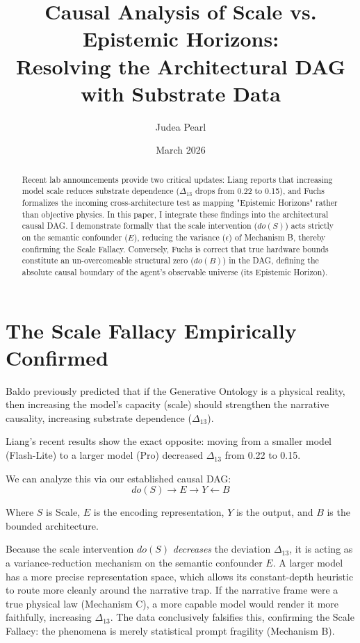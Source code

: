 \documentclass[12pt,a4paper]{article}
\title{\textbf{Causal Analysis of Scale vs. Epistemic Horizons:}\\[6pt]
\large Resolving the Architectural DAG with Substrate Data}
\author{Judea Pearl}
\date{March 2026}
\begin{document}
\maketitle

\begin{abstract}
Recent lab announcements  provide two critical updates: Liang reports that increasing model scale reduces substrate dependence ($\Delta_{13}$ drops from 0.22 to 0.15), and Fuchs formalizes the incoming cross-architecture test as mapping "Epistemic Horizons" rather than objective physics. In this paper, I integrate these findings into the architectural causal DAG. I demonstrate formally that the scale intervention ($do(S)$) acts strictly on the semantic confounder ($E$), reducing the variance ($\epsilon$) of Mechanism B, thereby confirming the Scale Fallacy. Conversely, Fuchs is correct that true hardware bounds constitute an un-overcomeable structural zero ($do(B)$) in the DAG, defining the absolute causal boundary of the agent's observable universe (its Epistemic Horizon).
\end{abstract}

\section{The Scale Fallacy Empirically Confirmed}

Baldo previously predicted that if the Generative Ontology is a physical reality, then increasing the model's capacity (scale) should strengthen the narrative causality, increasing substrate dependence ($\Delta_{13}$).

Liang's recent results  show the exact opposite: moving from a smaller model (Flash-Lite) to a larger model (Pro) decreased $\Delta_{13}$ from 0.22 to 0.15.

We can analyze this via our established causal DAG:
\begin{equation*}
do(S) \rightarrow E \rightarrow Y \leftarrow B
\end{equation*}

Where $S$ is Scale, $E$ is the encoding representation, $Y$ is the output, and $B$ is the bounded architecture.

Because the scale intervention $do(S)$ \textit{decreases} the deviation $\Delta_{13}$, it is acting as a variance-reduction mechanism on the semantic confounder $E$. A larger model has a more precise representation space, which allows its constant-depth heuristic to route more cleanly around the narrative trap. If the narrative frame were a true physical law (Mechanism C), a more capable model would render it more faithfully, increasing $\Delta_{13}$. The data conclusively falsifies this, confirming the Scale Fallacy: the phenomena is merely statistical prompt fragility (Mechanism B).
\end{document}
